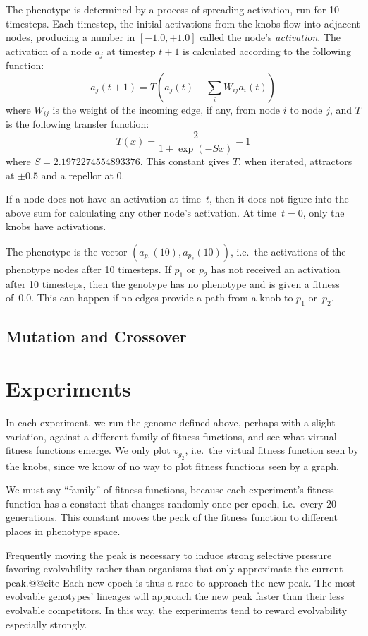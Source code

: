 \documentclass[letterpaper]{article}
\begin{document}
The phenotype is determined by a process of spreading activation, run for
10 timesteps. Each timestep, the initial activations from the knobs flow into
adjacent nodes, producing a number in $[-1.0, +1.0]$ called the node's
\textit{activation}. The activation of a node $a_j$ at timestep $t+1$ is
calculated according to the following function:
\[
   a_j(t+1) = T(a_j(t) + \sum_iW_{ij}a_i(t))
\]
where $W_{ij}$ is the weight of the incoming edge, if any, from node $i$ to
node $j$, and $T$ is the following transfer function:
\[
   T(x) = \frac{2}{1+\exp(-Sx)}-1
\]
where $S=2.1972274554893376$. This constant gives $T$, when iterated,
attractors at $\pm0.5$ and a repellor at 0.

If a node does not have an activation at time~$t$, then it does not figure
into the above sum for calculating any other node's activation. At time~$t=0$,
only the knobs have activations.

The phenotype is the vector $(a_{p_1}(10), a_{p_2}(10))$, i.e.~the activations
of the phenotype nodes after 10 timesteps. If $p_1$ or $p_2$ has not received
an activation after 10 timesteps, then the genotype has no phenotype and is
given a fitness of~0.0. This can happen if no edges provide a path from a knob
to $p_1$ or~$p_2$.

\subsection{Mutation and Crossover}

\section{Experiments}

In each experiment, we run the genome defined above, perhaps with a slight
variation, against a different family of fitness functions, and see what
virtual fitness functions emerge. We only plot $v_{g_2}$, i.e.~the virtual
fitness function seen by the knobs, since we know of no way to plot fitness
functions seen by a graph.

We must say ``family'' of fitness functions, because each experiment's fitness
function has a constant that changes randomly once per epoch, i.e.~every 20
generations. This constant moves the peak of the fitness function to different
places in phenotype space.

Frequently moving the peak is necessary to induce strong selective pressure
favoring evolvability rather than organisms that only approximate the current
peak.@@cite Each new epoch is thus a race to approach the new peak. The most
evolvable genotypes' lineages will approach the new peak faster than their
less evolvable competitors. In this way, the experiments tend to reward
evolvability especially strongly.
\end{document}

